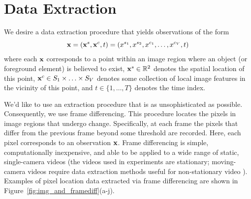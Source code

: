 \documentclass[twocolumn, final]{svjour3}
\begin{document}

\section{Data Extraction}
\label{sec:dataextraction}


We desire a data extraction procedure that yields observations of the form
\begin{equation}
\centering
\bold{x} = ( \bold{x}^{s}, \bold{x}^{c}, t ) = ( x^{s_{1}}, x^{s_{2}}, x^{c_{1}}, \ldots, x^{c_{V}}, t )
\end{equation}
where each $\bold{x}$ corresponds to a point within an image region where an object (or foreground element)  is believed to exist, $\bold{x}^{s} \in \mathbb{R}^{2}$ denotes the spatial location of this point, $\bold{x}^{c} \in S_{1} \times \ldots \times S_{V}$ denotes some collection of local image features in the vicinity of this point, and $t \in \{1, \ldots, T \}$ denotes the time index.

We'd like to use an extraction procedure that is as unsophisticated as possible. Consequently, we use frame differencing. This procedure locates the pixels in image regions that undergo change. Specifically, at each frame the pixels that differ from the previous frame beyond some threshold are recorded. Here, each pixel corresponds to an observation $\bold{x}$. Frame differencing is simple, computationally inexpensive, and able to be applied to a wide range of static, single-camera videos (the videos used in experiments are stationary; moving-camera videos require data extraction methods useful for non-stationary video \cite{chien2002efficient, zhang2007moving}). Examples of pixel location data extracted via frame differencing are shown in Figure~\ref{fig:img_and_framediff}(a-j).
\end{document}
